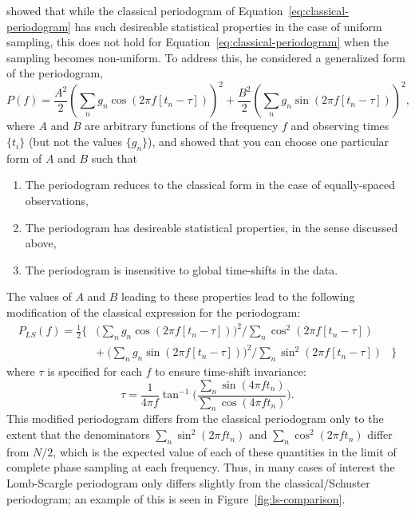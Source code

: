 \documentclass[preprint]{aastex}
\newcommand{\fig}[1]{Figure~\ref{fig:#1}}
\newcommand{\Eq}[1]{Equation~\ref{eq:#1}}
\newcommand{\eq}[1]{\Eq{#1}}
\newcommand{\eqlabel}[1]{\label{eq:#1}}
\begin{document}
\citet{Scargle82} showed that while the classical periodogram of
\eq{classical-periodogram} has such desireable statistical properties
in the case of uniform sampling, this does not hold for
\eq{classical-periodogram} when the sampling becomes non-uniform.
To address this, he considered a generalized form of the periodogram,
\begin{equation}
  P(f) = \frac{A^2}{2}\left(\sum_n g_n \cos(2\pi f [t_n-\tau])\right)^2
       + \frac{B^2}{2} \left(\sum_n g_n \sin(2\pi f [t_n-\tau])\right)^2,
\end{equation}
where $A$ and $B$ are arbitrary functions of the frequency $f$ and
observing times $\{t_i\}$ (but not the values $\{g_n\}$), and showed
that you can choose one particular form of $A$ and $B$ such that
\begin{enumerate}
  \item The periodogram reduces to the classical form in the case of equally-spaced observations,
  \item The periodogram has desireable statistical properties, in the sense discussed above,
  \item The periodogram is insensitive to global time-shifts in the data.
\end{enumerate}
The values of $A$ and $B$ leading to these properties lead to the following
modification of the classical expression for the periodogram:
\begin{eqnarray}
  P_{LS}(f) =
  \frac{1}{2} \Bigg\{ &
  \bigg(\sum_n g_n \cos(2\pi f [t_n-\tau])\bigg)^2 \bigg/
  \sum_n \cos^2(2\pi f [t_n-\tau]) &\nonumber\\
  & + ~ \bigg(\sum_n g_n \sin(2\pi f [t_n-\tau])\bigg)^2 \bigg/
  \sum_n \sin^2(2\pi f [t_n-\tau]) & \Bigg\}
  \eqlabel{lomb-scargle-periodogram}
\end{eqnarray}
where $\tau$ is specified for each $f$ to ensure time-shift invariance:
\begin{equation}
  \tau = \frac{1}{4\pi f}\tan^{-1}\Bigg(
  \frac{\sum_n \sin(4\pi f t_n)}{\sum_n \cos(4\pi f t_n)}\Bigg).
  \eqlabel{tau-def}
\end{equation}
This modified periodogram differs from the classical periodogram only to
the extent that the denominators $\sum_n \sin^2(2\pi f t_n)$ and
$\sum_n \cos^2(2\pi f t_n)$ differ from $N/2$, which is the expected value of
each of these quantities in the limit of complete phase sampling at each
frequency.
Thus, in many cases of interest the Lomb-Scargle periodogram only differs
slightly from the classical/Schuster periodogram; an example of this is seen
in \fig{ls-comparison}.
\end{document}
